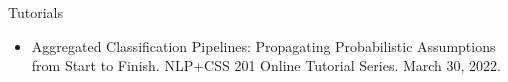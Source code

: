 \documentclass{resume} %
\begin{document}
\begin{rSection}{Tutorials}

\begin{itemize}
\item Aggregated Classification Pipelines: Propagating Probabilistic Assumptions from Start to Finish. NLP+CSS 201 Online Tutorial Series. March 30, 2022. 
\end{itemize}

\end{rSection}



\end{document}

